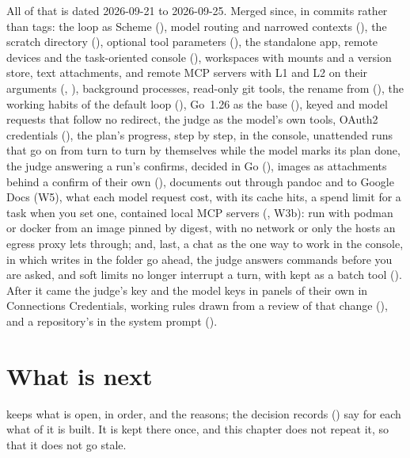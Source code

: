 All of that is dated 2026-09-21 to 2026-09-25. Merged since, in commits
rather than tags: the loop as Scheme (), model routing and narrowed
contexts (), the scratch directory (), optional tool
parameters (), the standalone app, remote devices and the
task-oriented console (), workspaces with mounts and a version store, text
attachments, and remote MCP servers with L1 and L2 on their arguments
(, ), background
processes, read-only git tools, the rename from  (),
the working habits of the default loop (), Go~1.26 as the
base (), keyed and model requests that follow no redirect, the
judge as the model's own tools, OAuth2 credentials (), the
plan's progress, step by step, in the console, unattended runs that go
on from turn to turn by themselves while the model marks its plan done,
the judge answering a run's confirms, decided in Go (), images as
attachments behind a confirm of their own (), documents out
through pandoc and to Google Docs (W5), what each model request
cost, with its cache hits, a spend limit for a task when you set one, contained local MCP servers (, W3b):
run with podman or docker from an image pinned by digest, with no network
or only the hosts an egress proxy lets through; and, last, a chat as the
one way to work in the console, in which writes in the folder go ahead,
the judge answers commands before you are asked, and soft limits no longer
interrupt a turn, with  kept as a batch tool ().
After it came the judge's key and the model keys in panels of their own in
Connections \textrightarrow{} Credentials, working rules drawn from a review
of that change (), and a repository's  in the
system prompt ().

\chapter{What is next}

 keeps what is open, in order, and the reasons; the decision
records () say for each what of it is built. It is kept there
once, and this chapter does not repeat it, so that it does not go stale.
